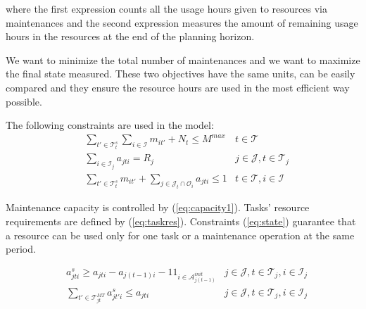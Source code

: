 \documentclass[a4paper,onecolumn,fleqn]{article}
\begin{document}
    where the first expression counts all the usage hours given to resources via maintenances and the second expression measures the amount of remaining usage hours in the resources at the end of the planning horizon.

    We want to minimize the total number of maintenances and we want to maximize the final state measured. These two objectives have the same units, can be easily compared and they ensure the resource hours are used in the most efficient way possible.

    The following constraints are used in the model:       
    \begin{align}
        & \sum_{t' \in \mathcal{T}^{s}_t} \sum_{i \in \mathcal{I}} m_{it'} + N_t \leq M^{max}
          & t \in \mathcal{T} \label{eq:capacity1}\\
        & \sum_{i \in \mathcal{I}_j} a_{jti} = R_j
                & j \in \mathcal{J}, t \in \mathcal{T}_j  \label{eq:taskres}\\
        & \sum_{t' \in \mathcal{T}^{s}_t} m_{it'} + \sum_{j \in \mathcal{J}_t \cap \mathcal{O}_i} a_{jti} \leq 1 
                & t \in \mathcal{T}, i \in \mathcal{I} \label{eq:state}
    \end{align}


    Maintenance capacity is controlled by (\ref{eq:capacity1}). Tasks' resource requirements are defined by (\ref{eq:taskres}). Constraints (\ref{eq:state}) guarantee that a resource can be used only for one task or a maintenance operation at the same period.  

    \begin{align}
        & a^s_{jti} \geq a_{jti} - a_{j(t-1)i} - 1 \!1_{i \in \mathcal{A}^{init}_{j(t-1)}}
                & j \in \mathcal{J}, t \in \mathcal{T}_j, i \in \mathcal{I}_j \label{eq:start1} \\
        & \sum_{t' \in \mathcal{T}^{MT}_{jt}} a^s_{jt'i} \leq a_{jti} 
        & j \in \mathcal{J}, t \in \mathcal{T}_j, i \in \mathcal{I}_j \label{eq:start3}
    \end{align}
\end{document}
